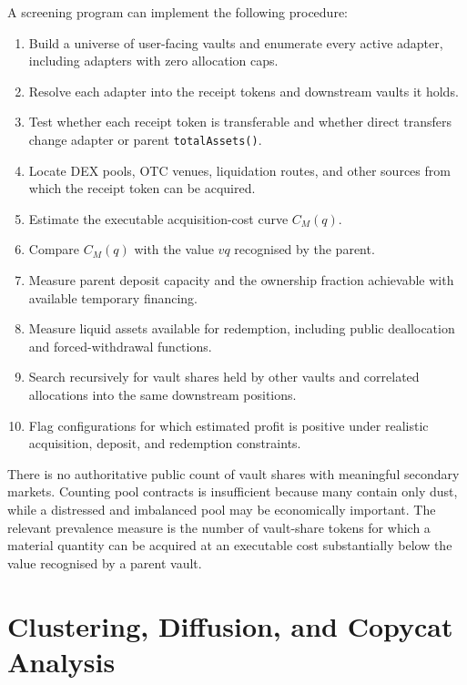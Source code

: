 \documentclass[11pt]{article}
\begin{document}
A screening program can implement the following procedure:
\begin{enumerate}[nosep]
    \item Build a universe of user-facing vaults and enumerate every active adapter, including adapters with zero allocation caps.
    \item Resolve each adapter into the receipt tokens and downstream vaults it holds.
    \item Test whether each receipt token is transferable and whether direct transfers change adapter or parent \texttt{totalAssets()}.
    \item Locate DEX pools, OTC venues, liquidation routes, and other sources from which the receipt token can be acquired.
    \item Estimate the executable acquisition-cost curve $C_M(q)$.
    \item Compare $C_M(q)$ with the value $vq$ recognised by the parent.
    \item Measure parent deposit capacity and the ownership fraction achievable with available temporary financing.
    \item Measure liquid assets available for redemption, including public deallocation and forced-withdrawal functions.
    \item Search recursively for vault shares held by other vaults and correlated allocations into the same downstream positions.
    \item Flag configurations for which estimated profit is positive under realistic acquisition, deposit, and redemption constraints.
\end{enumerate}

There is no authoritative public count of vault shares with meaningful secondary markets.  Counting pool contracts is insufficient because many contain only dust, while a distressed and imbalanced pool may be economically important.  The relevant prevalence measure is the number of vault-share tokens for which a material quantity can be acquired at an executable cost substantially below the value recognised by a parent vault.

\section{Clustering, Diffusion, and Copycat Analysis}
\end{document}
